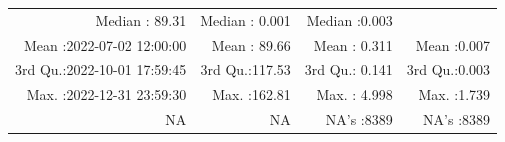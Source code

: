 \documentclass[
  10pt,
  a4paper,oneside]{article}
\begin{document}
\begin{longtable}[]{@{}rrrr@{}}
\begin{minipage}[t]{0.19\columnwidth}
Median : 89.31\strut
\end{minipage} & \begin{minipage}[t]{0.19\columnwidth}\raggedleft
Median : 0.001\strut
\end{minipage} & \begin{minipage}[t]{0.19\columnwidth}\raggedleft
Median :0.003\strut
\end{minipage}\tabularnewline
\begin{minipage}[t]{0.33\columnwidth}\raggedleft
Mean :2022-07-02 12:00:00\strut
\end{minipage} & \begin{minipage}[t]{0.19\columnwidth}\raggedleft
Mean : 89.66\strut
\end{minipage} & \begin{minipage}[t]{0.19\columnwidth}\raggedleft
Mean : 0.311\strut
\end{minipage} & \begin{minipage}[t]{0.19\columnwidth}\raggedleft
Mean :0.007\strut
\end{minipage}\tabularnewline
\begin{minipage}[t]{0.33\columnwidth}\raggedleft
3rd Qu.:2022-10-01 17:59:45\strut
\end{minipage} & \begin{minipage}[t]{0.19\columnwidth}\raggedleft
3rd Qu.:117.53\strut
\end{minipage} & \begin{minipage}[t]{0.19\columnwidth}\raggedleft
3rd Qu.: 0.141\strut
\end{minipage} & \begin{minipage}[t]{0.19\columnwidth}\raggedleft
3rd Qu.:0.003\strut
\end{minipage}\tabularnewline
\begin{minipage}[t]{0.33\columnwidth}\raggedleft
Max. :2022-12-31 23:59:30\strut
\end{minipage} & \begin{minipage}[t]{0.19\columnwidth}\raggedleft
Max. :162.81\strut
\end{minipage} & \begin{minipage}[t]{0.19\columnwidth}\raggedleft
Max. : 4.998\strut
\end{minipage} & \begin{minipage}[t]{0.19\columnwidth}\raggedleft
Max. :1.739\strut
\end{minipage}\tabularnewline
\begin{minipage}[t]{0.33\columnwidth}\raggedleft
NA\strut
\end{minipage} & \begin{minipage}[t]{0.19\columnwidth}\raggedleft
NA\strut
\end{minipage} & \begin{minipage}[t]{0.19\columnwidth}\raggedleft
NA's :8389\strut
\end{minipage} & \begin{minipage}[t]{0.19\columnwidth}\raggedleft
NA's :8389\strut
\end{minipage}\tabularnewline
\bottomrule
\end{longtable}
\end{document}
